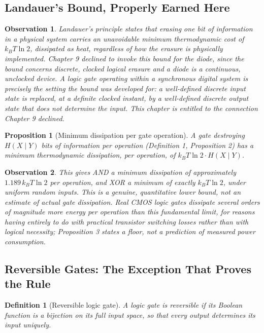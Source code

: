 \documentclass[12pt]{article}
\newtheorem{definition}{Definition}
\newtheorem{proposition}{Proposition}
\newtheorem{observation}{Observation}
\begin{document}
\subsection{Landauer's Bound, Properly Earned Here}

\begin{observation}
Landauer's principle states that erasing one bit of information in a physical system carries an unavoidable minimum thermodynamic cost of $k_BT\ln 2$, dissipated as heat, regardless of how the erasure is physically implemented. Chapter 9 declined to invoke this bound for the diode, since the bound concerns discrete, clocked logical erasure and a diode is a continuous, unclocked device. A logic gate operating within a synchronous digital system is precisely the setting the bound was developed for: a well-defined discrete input state is replaced, at a definite clocked instant, by a well-defined discrete output state that does not determine the input. This chapter is entitled to the connection Chapter 9 declined.
\end{observation}

\begin{proposition}[Minimum dissipation per gate operation]
A gate destroying $H(X\mid Y)$ bits of information per operation (Definition 1, Proposition 2) has a minimum thermodynamic dissipation, per operation, of $k_BT\ln 2 \cdot H(X\mid Y)$.
\end{proposition}

\begin{observation}
This gives AND a minimum dissipation of approximately $1.189\, k_BT\ln 2$ per operation, and XOR a minimum of exactly $k_BT\ln 2$, under uniform random inputs. This is a genuine, quantitative lower bound, not an estimate of actual gate dissipation. Real CMOS logic gates dissipate several orders of magnitude more energy per operation than this fundamental limit, for reasons having entirely to do with practical transistor switching losses rather than with logical necessity; Proposition 3 states a floor, not a prediction of measured power consumption.
\end{observation}

\subsection{Reversible Gates: The Exception That Proves the Rule}

\begin{definition}[Reversible logic gate]
A logic gate is reversible if its Boolean function is a bijection on its full input space, so that every output determines its input uniquely.
\end{definition}
\end{document}
